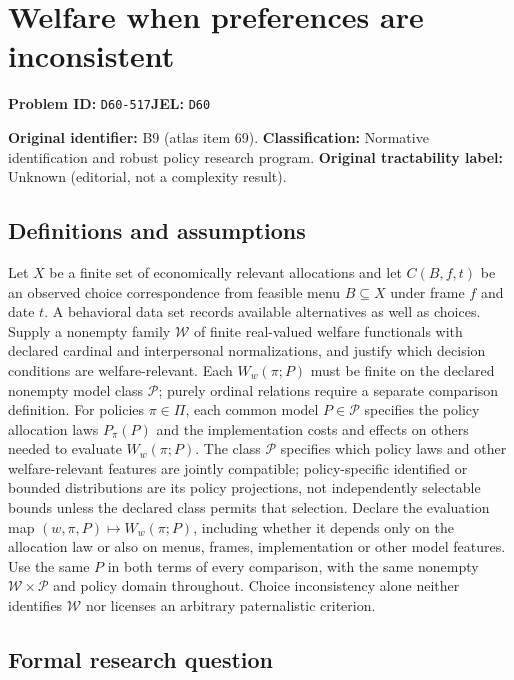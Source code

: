\documentclass[11pt,a4paper]{article}
\begin{document}
\section*{Welfare when preferences are inconsistent}
\textbf{Problem ID:} \texttt{D60-517}\quad \textbf{JEL:} \texttt{D60}\par
\label{problem:OP-0069}
\label{atlas:prob:B9}

\noindent\textbf{Original identifier:} B9 (atlas item 69). \textbf{Classification:} Normative identification and robust policy research program. \textbf{Original tractability label:} Unknown (editorial, not a complexity result).

\subsection*{Definitions and assumptions}

Let $X$ be a finite set of economically relevant allocations and let $C(B,f,t)$ be an observed choice correspondence from feasible menu $B\subseteq X$ under frame $f$ and date $t$. A behavioral data set records available alternatives as well as choices. Supply a nonempty family $\mathcal W$ of finite real-valued welfare functionals with declared cardinal and interpersonal normalizations, and justify which decision conditions are welfare-relevant. Each $W_w(\pi;P)$ must be finite on the declared nonempty model class $\mathcal P$; purely ordinal relations require a separate comparison definition. For policies $\pi\in\Pi$, each common model $P\in\mathcal P$ specifies the policy allocation laws $P_\pi(P)$ and the implementation costs and effects on others needed to evaluate $W_w(\pi;P)$. The class $\mathcal P$ specifies which policy laws and other welfare-relevant features are jointly compatible; policy-specific identified or bounded distributions are its policy projections, not independently selectable bounds unless the declared class permits that selection. Declare the evaluation map $(w,\pi,P)\mapsto W_w(\pi;P)$, including whether it depends only on the allocation law or also on menus, frames, implementation or other model features. Use the same $P$ in both terms of every comparison, with the same nonempty $\mathcal W\times\mathcal P$ and policy domain throughout. Choice inconsistency alone neither identifies $\mathcal W$ nor licenses an arbitrary paternalistic criterion.

\subsection*{Formal research question}
\end{document}
